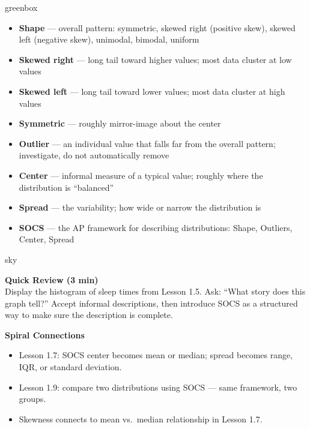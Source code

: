 \documentclass[10pt]{article}
\begin{document}
\begin{skillbox}{greenbox}
\begin{minipage}[t]{0.48\linewidth}
    \begin{itemize}
        \item \textbf{Shape} --- overall pattern: symmetric, skewed right (positive skew), skewed left (negative skew), unimodal, bimodal, uniform
        \item \textbf{Skewed right} --- long tail toward higher values; most data cluster at low values
        \item \textbf{Skewed left} --- long tail toward lower values; most data cluster at high values
        \item \textbf{Symmetric} --- roughly mirror-image about the center
    \end{itemize}
\end{minipage}
\hfill
\begin{minipage}[t]{0.48\linewidth}
    \begin{itemize}
        \item \textbf{Outlier} --- an individual value that falls far from the overall pattern; investigate, do not automatically remove
        \item \textbf{Center} --- informal measure of a typical value; roughly where the distribution is ``balanced''
        \item \textbf{Spread} --- the variability; how wide or narrow the distribution is
        \item \textbf{SOCS} --- the AP framework for describing distributions: Shape, Outliers, Center, Spread
    \end{itemize}
\end{minipage}
\end{skillbox}

\begin{skillbox}{sky}
\begin{minipage}[t]{0.48\linewidth}
    \textbf{Quick Review (3 min)}\\
    Display the histogram of sleep times from Lesson 1.5. Ask: ``What story does this graph tell?'' Accept informal descriptions, then introduce SOCS as a structured way to make sure the description is complete.
\end{minipage}
\hfill
\begin{minipage}[t]{0.48\linewidth}
    \textbf{Spiral Connections}
    \begin{itemize}
        \item Lesson 1.7: SOCS center becomes mean or median; spread becomes range, IQR, or standard deviation.
        \item Lesson 1.9: compare two distributions using SOCS --- same framework, two groups.
        \item Skewness connects to mean vs.\ median relationship in Lesson 1.7.
    \end{itemize}
\end{minipage}
\end{skillbox}
\end{document}

